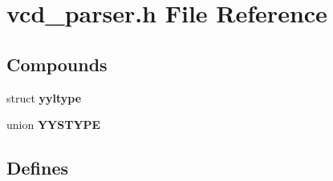 \section{vcd\_\-parser.h File Reference}
\label{vcd__parser_8h}
\subsection*{Compounds}
\begin{CompactItemize}
\item 
struct {\bf yyltype}
\item 
union {\bf YYSTYPE}
\end{CompactItemize}
\subsection*{Defines}
